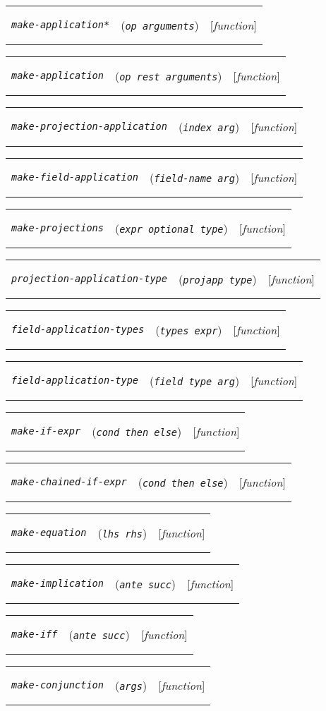 \documentclass[12pt]{book}
\makeatletter
\def\ampoptional{{\smaller\sc {\smaller\smaller \&}optional\ }}
\def\amprest{{\smaller\sc {\smaller\smaller \&}rest\ }}
\newenvironment{function}[3]%
{\par\noindent\begin{boxedminipage}{\textwidth}%
 \par\noindent\begin{tabularx}{\linewidth}{l>{\raggedright}Xr}%
 \functionhtgt{#1}&(\texttt{\textit{#2}})&[\emph{#3}]%
 \end{tabularx}\par\flushright\begin{minipage}{.97\textwidth}}
{\end{minipage}\end{boxedminipage}}
\newcommand{\functionnm}[1]{\texttt{\textit{#1}}}
\newcommand{\functionhtgt}[1]{\hypertarget{#1}{\functionnm{#1}}\index{#1@\functionnm{#1}|underline}}
\newenvironment{lispfunction}[2]%
{\begin{function}{#1}{#2}{function}}{\end{function}}
\makeatother
\begin{document}
\begin{lispfunction}{make-application*}{op arguments}
\end{lispfunction}
                 
\begin{lispfunction}{make-application}{op \amprest arguments}
\end{lispfunction}

\begin{lispfunction}{make-projection-application}{index arg}
\end{lispfunction}

\begin{lispfunction}{make-field-application}{field-name arg}
\end{lispfunction}

\begin{lispfunction}{make-projections}{expr \ampoptional type}
\end{lispfunction}

\begin{lispfunction}{projection-application-type}{projapp type}
\end{lispfunction}

\begin{lispfunction}{field-application-types}{types expr}
\end{lispfunction}

\begin{lispfunction}{field-application-type}{field type arg}
\end{lispfunction}

\begin{lispfunction}{make-if-expr}{cond then else}
\end{lispfunction}

\begin{lispfunction}{make-chained-if-expr}{cond then else}
\end{lispfunction}

\begin{lispfunction}{make-equation}{lhs rhs}
\end{lispfunction}

\begin{lispfunction}{make-implication}{ante succ}
\end{lispfunction}

\begin{lispfunction}{make-iff}{ante succ}
\end{lispfunction}

\begin{lispfunction}{make-conjunction}{args}
\end{lispfunction}
\end{document}

